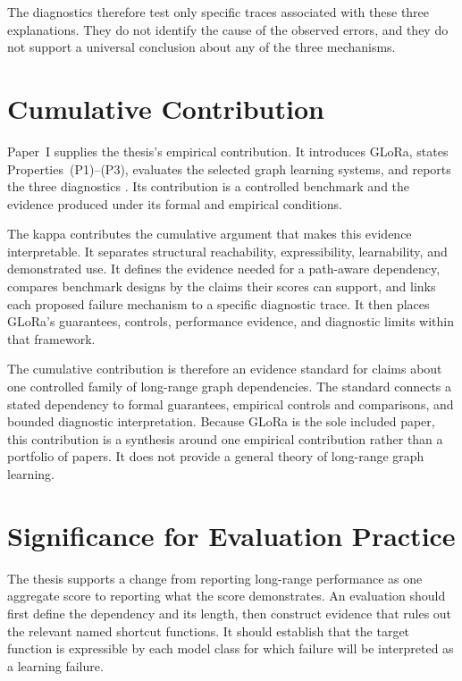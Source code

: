 The diagnostics therefore test only specific traces associated with these three explanations.
They do not identify the cause of the observed errors, and they do not support a universal conclusion about any of the three mechanisms.

\section{Cumulative Contribution}

Paper~I supplies the thesis's empirical contribution.
It introduces GLoRa, states Properties~(P1)--(P3), evaluates the selected graph learning systems, and reports the three diagnostics \cite{zhou2025glora}.
Its contribution is a controlled benchmark and the evidence produced under its formal and empirical conditions.

The kappa contributes the cumulative argument that makes this evidence interpretable.
It separates structural reachability, expressibility, learnability, and demonstrated use.
It defines the evidence needed for a path-aware dependency, compares benchmark designs by the claims their scores can support, and links each proposed failure mechanism to a specific diagnostic trace.
It then places GLoRa's guarantees, controls, performance evidence, and diagnostic limits within that framework.

The cumulative contribution is therefore an evidence standard for claims about one controlled family of long-range graph dependencies.
The standard connects a stated dependency to formal guarantees, empirical controls and comparisons, and bounded diagnostic interpretation.
Because GLoRa is the sole included paper, this contribution is a synthesis around one empirical contribution rather than a portfolio of papers.
It does not provide a general theory of long-range graph learning.

\section{Significance for Evaluation Practice}

The thesis supports a change from reporting long-range performance as one aggregate score to reporting what the score demonstrates.
An evaluation should first define the dependency and its length, then construct evidence that rules out the relevant named shortcut functions.
It should establish that the target function is expressible by each model class for which failure will be interpreted as a learning failure.

